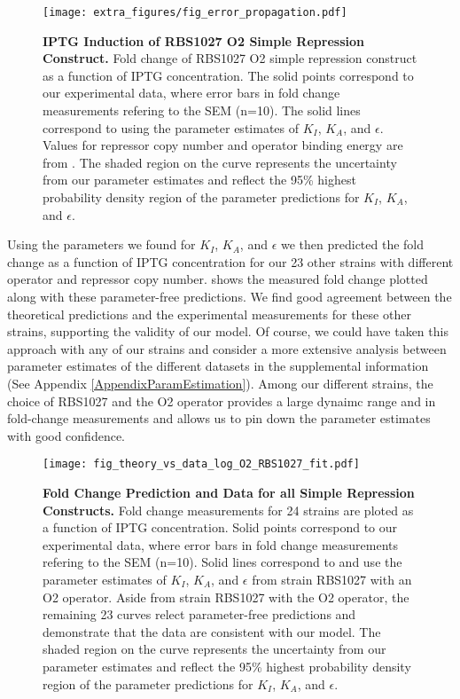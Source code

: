 \begin{figure}[h]
	\centering \texttt{[image: extra\_figures/fig\_error\_propagation.pdf]}
	\caption{{\bf IPTG Induction of RBS1027 O2 Simple Repression Construct.} Fold change of RBS1027 O2 simple repression construct as a function of IPTG concentration. The solid points correspond to our experimental data, where error bars in fold change measurements refering to the SEM (n=10). The solid lines correspond to \eref[eq7] using the parameter estimates of $K_I$, $K_A$, and $\epsilon$. Values for repressor copy number and operator binding energy are from \cite{Garcia2011}.  The shaded region on the curve represents the uncertainty from our parameter estimates and reflect the 95\% highest probability density region of the parameter predictions for $K_I$, $K_A$, and $\epsilon$.}
	\label{fig_result1}
\end{figure}

Using the parameters we found for $K_I$, $K_A$, and $\epsilon$ we then predicted the fold change as a function of IPTG concentration for our 23 other strains with different operator and repressor copy number.  shows the measured fold change plotted along with these parameter-free predictions. We find good agreement between the theoretical predictions and the experimental measurements for these other strains, supporting the validity of our model. Of course, we could have taken this approach with any of our strains and  consider a more extensive analysis between parameter estimates of the different datasets in the supplemental information (See Appendix \ref{AppendixParamEstimation}). Among our different strains, the choice of RBS1027 and the O2 operator provides a large dynaimc range and in fold-change measurements and allows us to pin down the parameter estimates with good confidence. 

\begin{figure}[h]
	\centering \texttt{[image: fig\_theory\_vs\_data\_log\_O2\_RBS1027\_fit.pdf]}
	\caption{{\bf Fold Change Prediction and Data for all Simple Repression Constructs.}  Fold change measurements for 24 strains are ploted as a function of IPTG concentration. Solid points correspond to our experimental data, where error bars in fold change measurements refering to the SEM (n=10). Solid lines correspond to \eref[eq7] and use the parameter estimates of $K_I$, $K_A$, and $\epsilon$ from strain RBS1027 with an O2 operator. Aside from strain RBS1027 with the O2 operator, the remaining 23 curves relect parameter-free predictions and demonstrate that the data are consistent with our model. The shaded region on the curve represents the uncertainty from our parameter estimates and reflect the 95\% highest probability density region of the parameter predictions for $K_I$, $K_A$, and $\epsilon$.}
	\label{fig_result2}
\end{figure}

